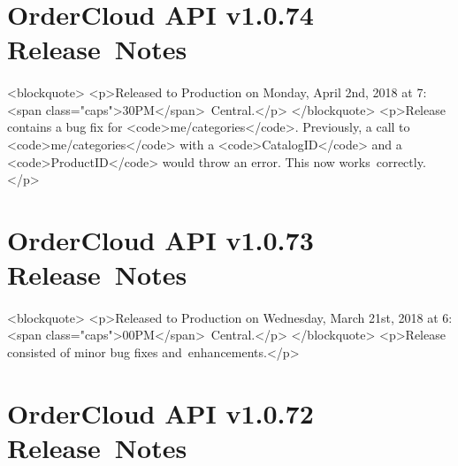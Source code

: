 \documentclass{memoir}%
\begin{document}
%
\section*{OrderCloud API v1.0.74 Release~Notes}%
\paragraph*{}%

%
\paragraph*{}%
<blockquote>\newline%
<p>Released to Production on Monday, April 2nd, 2018 at 7:<span class="caps">30PM</span>~Central.</p>\newline%
</blockquote>\newline%
<p>Release contains a bug fix for <code>me/categories</code>. Previously, a call to <code>me/categories</code> with a <code>CatalogID</code> and a <code>ProductID</code> would throw an error. This now works~correctly.</p>

%
\section*{OrderCloud API v1.0.73 Release~Notes}%
\paragraph*{}%

%
\paragraph*{}%
<blockquote>\newline%
<p>Released to Production on Wednesday, March 21st, 2018 at 6:<span class="caps">00PM</span>~Central.</p>\newline%
</blockquote>\newline%
<p>Release consisted of minor bug fixes and~enhancements.</p>

%
\section*{OrderCloud API v1.0.72 Release~Notes}%
\paragraph*{}%

%
\end{document}
